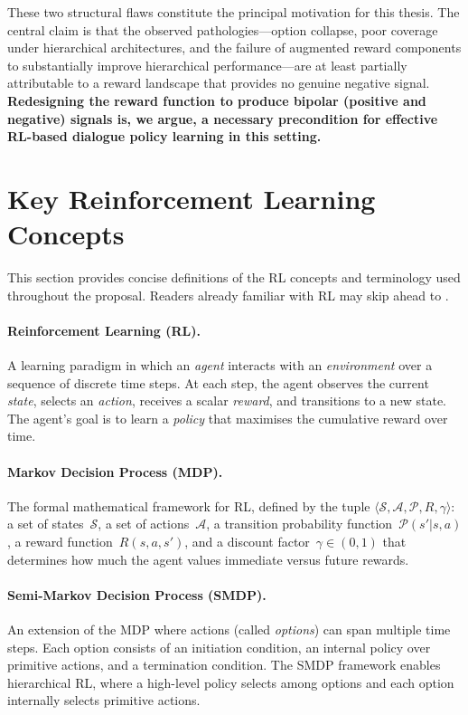 \documentclass[12pt,a4paper]{article}
\begin{document}
These two structural flaws constitute the principal motivation for this thesis. The central claim is that the observed pathologies---option collapse, poor coverage under hierarchical architectures, and the failure of augmented reward components to substantially improve hierarchical performance---are at least partially attributable to a reward landscape that provides no genuine negative signal. \textbf{Redesigning the reward function to produce bipolar (positive and negative) signals is, we argue, a necessary precondition for effective RL-based dialogue policy learning in this setting.}

\section{Key Reinforcement Learning Concepts}
\label{sec:glossary}

This section provides concise definitions of the RL concepts and terminology used throughout the proposal. Readers already familiar with RL may skip ahead to .

\paragraph{Reinforcement Learning (RL).}
A learning paradigm in which an \emph{agent} interacts with an \emph{environment} over a sequence of discrete time steps. At each step, the agent observes the current \emph{state}, selects an \emph{action}, receives a scalar \emph{reward}, and transitions to a new state. The agent's goal is to learn a \emph{policy} that maximises the cumulative reward over time.

\paragraph{Markov Decision Process (MDP).}
The formal mathematical framework for RL, defined by the tuple $\langle \mathcal{S}, \mathcal{A}, \mathcal{P}, R, \gamma \rangle$: a set of states~$\mathcal{S}$, a set of actions~$\mathcal{A}$, a transition probability function~$\mathcal{P}(s' | s, a)$, a reward function~$R(s, a, s')$, and a discount factor~$\gamma \in (0,1)$ that determines how much the agent values immediate versus future rewards.

\paragraph{Semi-Markov Decision Process (SMDP).}
An extension of the MDP where actions (called \emph{options}) can span multiple time steps. Each option consists of an initiation condition, an internal policy over primitive actions, and a termination condition. The SMDP framework enables hierarchical RL, where a high-level policy selects among options and each option internally selects primitive actions.
\end{document}
